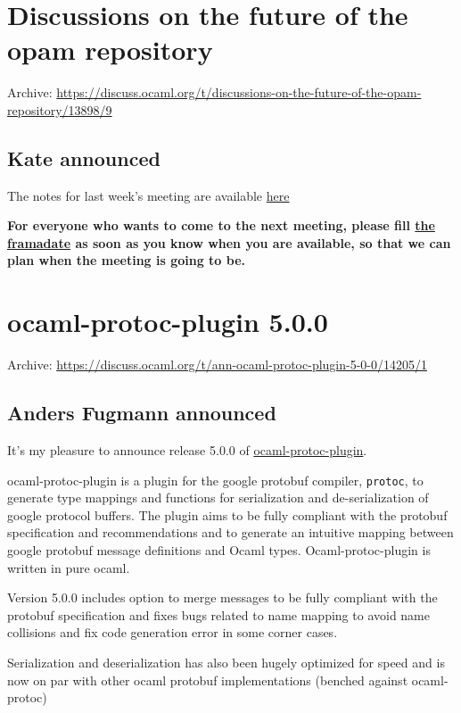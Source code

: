 \documentclass[11pt]{article}
\begin{document}
\section*{Discussions on the future of the opam repository}
\label{4}
Archive: \url{https://discuss.ocaml.org/t/discussions-on-the-future-of-the-opam-repository/13898/9}
\subsection*{Kate announced}
\label{sec:orgb892fc3}


The notes for last week's meeting are available \href{https://github.com/ocaml/opam-repository/issues/23789\#issuecomment-1961757335}{here}

\textbf{For everyone who wants to come to the next meeting, please fill \href{https://framadate.org/qD2Pb57B7h6xJ8U4}{the framadate} as soon as
you know when you are available, so that we can plan when the meeting is going to be.}
\section*{ocaml-protoc-plugin 5.0.0}
\label{5}
Archive: \url{https://discuss.ocaml.org/t/ann-ocaml-protoc-plugin-5-0-0/14205/1}
\subsection*{Anders Fugmann announced}
\label{sec:org4102034}


It's my pleasure to announce release 5.0.0 of \href{https://github.com/andersfugmann/ocaml-protoc-plugin}{ocaml-protoc-plugin}.

ocaml-protoc-plugin is a plugin for the google protobuf compiler, \texttt{protoc}, to generate type mappings and functions for serialization
and de-serialization of google protocol buffers. The plugin aims to be fully compliant with the protobuf specification and
recommendations and to generate an intuitive mapping between google protobuf message definitions and Ocaml types. Ocaml-protoc-plugin
is written in pure ocaml.

Version 5.0.0 includes option to merge messages to be fully compliant with the protobuf specification and fixes bugs related to name
mapping to avoid name collisions and fix code generation error in some corner cases.

Serialization and deserialization has also been hugely optimized for speed and is now on par with other ocaml protobuf
implementations (benched against ocaml-protoc)
\end{document}
